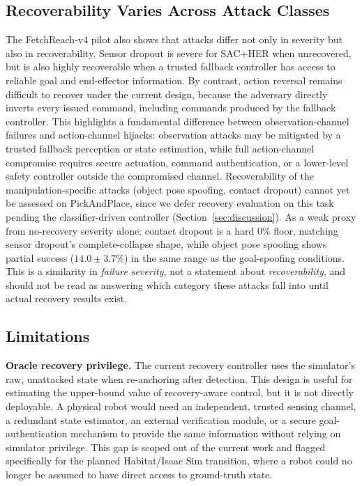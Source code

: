 \documentclass[conference]{IEEEtran}
\begin{document}
\subsection{Recoverability Varies Across Attack Classes}

The FetchReach-v4 pilot also shows that attacks differ not only in severity but also in
recoverability. Sensor dropout is severe for SAC+HER when unrecovered, but is also
highly recoverable when a trusted fallback controller has access to reliable goal and
end-effector information. By contrast, action reversal remains difficult to recover
under the current design, because the adversary directly inverts every issued command,
including commands produced by the fallback controller. This highlights a fundamental
difference between observation-channel failures and action-channel hijacks:
observation attacks may be mitigated by a trusted fallback perception or state
estimation, while full action-channel compromise requires secure actuation, command
authentication, or a lower-level safety controller outside the compromised channel.
Recoverability of the manipulation-specific attacks (object pose spoofing, contact
dropout) cannot yet be assessed on PickAndPlace, since we defer recovery evaluation on
this task pending the classifier-driven controller (Section~\ref{sec:discussion}). As
a weak proxy from no-recovery severity alone: contact dropout is a hard $0\%$ floor,
matching sensor dropout's complete-collapse shape, while object pose spoofing shows
partial success ($14.0\pm3.7\%$) in the same range as the goal-spoofing conditions.
This is a similarity in \emph{failure severity}, not a statement about
\emph{recoverability}, and should not be read as answering which category these
attacks fall into until actual recovery results exist.

\subsection{Limitations}

\textbf{Oracle recovery privilege.}
The current recovery controller uses the simulator's raw, unattacked state when
re-anchoring after detection. This design is useful for estimating the upper-bound value
of recovery-aware control, but it is not directly deployable. A physical robot would
need an independent, trusted sensing channel, a redundant state estimator, an external
verification module, or a secure goal-authentication mechanism to provide the same
information without relying on simulator privilege. This gap is scoped out of the
current work and flagged specifically for the planned Habitat/Isaac Sim transition,
where a robot could no longer be assumed to have direct access to ground-truth state.
\end{document}
